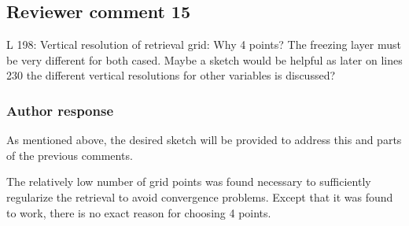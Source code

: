 \documentclass[11pt]{scrartcl}
\begin{document}
%
%
%


\subsection*{Reviewer comment 15}

L 198: Vertical resolution of retrieval grid: Why 4 points? The freezing layer
must be very different for both cased. Maybe a sketch would be helpful as later
on lines 230 the different vertical resolutions for other variables is discussed?

\subsubsection*{Author response}

As mentioned above, the desired sketch will be provided to address this and parts
of the previous comments.

The relatively low number of grid points was found necessary to sufficiently regularize
the retrieval to avoid convergence problems. Except that it was found to work, there is
no exact reason for choosing 4 points. 
\end{document}
